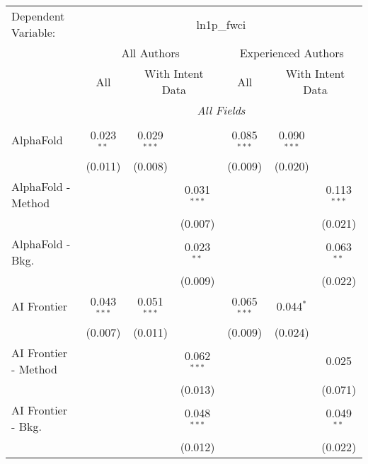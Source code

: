 \begingroup
\centering
\begin{tabular}{lcccccc}
   \tabularnewline \midrule \midrule
   Dependent Variable: & \multicolumn{6}{c}{ln1p\_fwci}\\
 & \multicolumn{3}{c}{All Authors} & \multicolumn{3}{c}{Experienced Authors} \\
\cmidrule(lr){2-4} \cmidrule(lr){5-7}
 & \multicolumn{1}{c}{All} & \multicolumn{2}{c}{With Intent Data} & \multicolumn{1}{c}{All} & \multicolumn{2}{c}{With Intent Data} \\
\cmidrule(lr){2-2} \cmidrule(lr){3-4} \cmidrule(lr){5-5} \cmidrule(lr){6-7}
 & \multicolumn{6}{c}{\textit{All Fields}} \\ \\
   AlphaFold            & 0.023$^{**}$  & 0.029$^{***}$ &               & 0.085$^{***}$ & 0.090$^{***}$ &   \\   
                        & (0.011)       & (0.008)       &               & (0.009)       & (0.020)       &   \\   
   AlphaFold - Method   &               &               & 0.031$^{***}$ &               &               & 0.113$^{***}$\\   
                        &               &               & (0.007)       &               &               & (0.021)\\   
   AlphaFold - Bkg.     &               &               & 0.023$^{**}$  &               &               & 0.063$^{**}$\\   
                        &               &               & (0.009)       &               &               & (0.022)\\   
   AI Frontier          & 0.043$^{***}$ & 0.051$^{***}$ &               & 0.065$^{***}$ & 0.044$^{*}$   &   \\   
                        & (0.007)       & (0.011)       &               & (0.009)       & (0.024)       &   \\   
   AI Frontier - Method &               &               & 0.062$^{***}$ &               &               & 0.025\\   
                        &               &               & (0.013)       &               &               & (0.071)\\   
   AI Frontier - Bkg.   &               &               & 0.048$^{***}$ &               &               & 0.049$^{**}$\\   
                        &               &               & (0.012)       &               &               & (0.022)\\   

\end{tabular}
